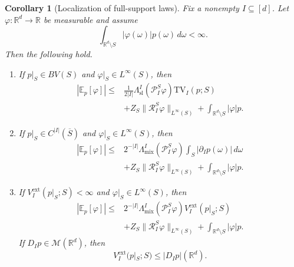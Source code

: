 \documentclass[11pt,letterpaper]{article}
\newtheorem{corollary}[theorem]{Corollary}
\theoremstyle{definition}
\theoremstyle{remark}
\newcommand{\TV}{\mathrm{TV}}
\begin{document}
\begin{corollary}[Localization of full-support laws]
\label{cor:main_full_support_localization}
Fix a nonempty $I\subseteq[d]$. Let $\varphi:\mathbb R^d\to\mathbb R$ be measurable and assume
$$
\int_{\mathbb R^d\setminus S}|\varphi(\omega)|p(\omega)\,d\omega<\infty.
$$
Then the following hold.

\begin{enumerate}
\item[\emph{(i)}] If $p|_S\in BV(S)$ and
$\varphi|_S\in L^\infty(S)$, then
\begin{equation}
\label{eq:main_full_support_tv_localization}
\begin{aligned}
|\mathbb E_p[\varphi]|
\le{}&
\frac{1}{2|I|}
\Lambda_{\mathrm{sl}}^I(\mathcal P_I^S\varphi)
\TV_I(p;S)
\\
&+
Z_S\|\mathcal R_I^S\varphi\|_{L^\infty(S)}
+
\int_{\mathbb R^d\setminus S}|\varphi|p.
\end{aligned}
\end{equation}

\item[\emph{(ii)}] If $p|_S\in C^{|I|}(\overline S)$ and
$\varphi|_S\in L^\infty(S)$, then
\begin{equation}
\label{eq:main_full_support_mixed_localization}
\begin{aligned}
|\mathbb E_p[\varphi]|
\le{}&
2^{-|I|}
\Lambda_{\mathrm{mix}}^I(\mathcal P_I^S\varphi)
\int_S|\partial_Ip(\omega)|\,d\omega
\\
&+
Z_S\|\mathcal R_I^S\varphi\|_{L^\infty(S)}
+
\int_{\mathbb R^d\setminus S}|\varphi|p.
\end{aligned}
\end{equation}

\item[\emph{(iii)}] If
$V_I^{\mathrm{ext}}(p|_S;S)<\infty$ and
$\varphi|_S\in L^\infty(S)$, then
\begin{equation}
\label{eq:main_full_support_nonsmooth_localization}
\begin{aligned}
|\mathbb E_p[\varphi]|
\le{}&
2^{-|I|}
\Lambda_{\mathrm{mix}}^I(\mathcal P_I^S\varphi)
V_I^{\mathrm{ext}}(p|_S;S)
\\
&+
Z_S\|\mathcal R_I^S\varphi\|_{L^\infty(S)}
+
\int_{\mathbb R^d\setminus S}|\varphi|p.
\end{aligned}
\end{equation}
If $D_Ip\in\mathcal M(\mathbb R^d)$, then
$$
V_I^{\mathrm{ext}}(p|_S;S)
\le
|D_Ip|(\mathbb R^d).
$$
\end{enumerate}
\end{corollary}
\end{document}
